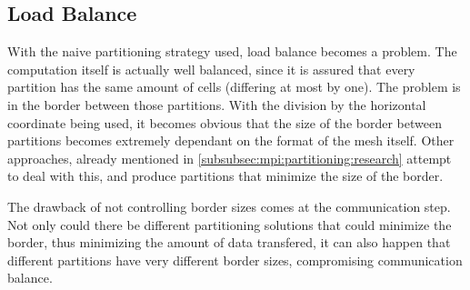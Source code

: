 \subsection{Load Balance}
\label{subsec:mpi:load}


With the naive partitioning strategy used, load balance becomes a problem.
The computation itself is actually well balanced, since it is assured that every partition has the same amount of cells (differing at most by one). The problem is in the border between those partitions.
With the division by the horizontal coordinate being used, it becomes obvious that the size of the border between partitions becomes extremely dependant on the format of the mesh itself.
Other approaches, already mentioned in \cref{subsubsec:mpi:partitioning:research} attempt to deal with this, and produce partitions that minimize the size of the border.

The drawback of not controlling border sizes comes at the communication step.
Not only could there be different partitioning solutions that could minimize the border, thus minimizing the amount of data transfered, it can also happen that different partitions have very different border sizes, compromising communication balance.

